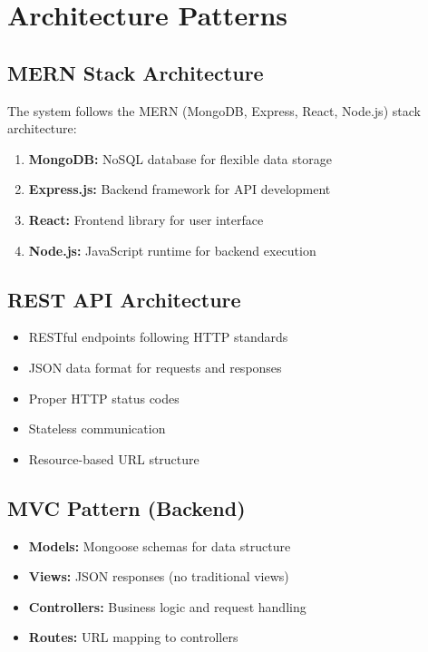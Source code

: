\section{Architecture Patterns}

\subsection{MERN Stack Architecture}

The system follows the MERN (MongoDB, Express, React, Node.js) stack architecture:

\begin{enumerate}[leftmargin=*]
    \item \textbf{MongoDB:} NoSQL database for flexible data storage
    \item \textbf{Express.js:} Backend framework for API development
    \item \textbf{React:} Frontend library for user interface
    \item \textbf{Node.js:} JavaScript runtime for backend execution
\end{enumerate}

\subsection{REST API Architecture}

\begin{itemize}[leftmargin=*]
    \item RESTful endpoints following HTTP standards
    \item JSON data format for requests and responses
    \item Proper HTTP status codes
    \item Stateless communication
    \item Resource-based URL structure
\end{itemize}

\subsection{MVC Pattern (Backend)}

\begin{itemize}[leftmargin=*]
    \item \textbf{Models:} Mongoose schemas for data structure
    \item \textbf{Views:} JSON responses (no traditional views)
    \item \textbf{Controllers:} Business logic and request handling
    \item \textbf{Routes:} URL mapping to controllers
\end{itemize}

